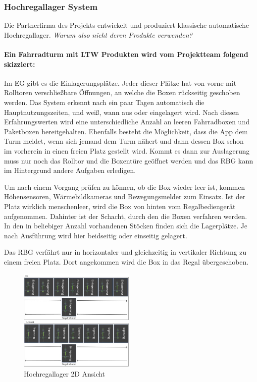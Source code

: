 \subsubsection{Hochregallager System}
Die Partnerfirma des Projekts entwickelt und produziert klassische automatische Hochregallager. \textit{Warum also nicht deren Produkte verwenden?}

\paragraph{Ein Fahrradturm mit LTW Produkten wird vom Projektteam folgend skizziert:}
Im EG gibt es die Einlagerungsplätze. Jeder dieser Plätze hat von vorne mit Rolltoren verschließbare Öffnungen, an welche die Boxen rückseitig geschoben werden. Das System erkennt nach ein paar Tagen automatisch die Hauptnutzungszeiten, und weiß, wann aus oder eingelagert wird. Nach diesen Erfahrungswerten wird eine unterschiedliche Anzahl an leeren Fahrradboxen und Paketboxen bereitgehalten. Ebenfalls besteht die Möglichkeit, dass die App dem Turm meldet, wenn sich jemand dem Turm nähert und dann dessen Box schon im vorherein in einen freien Platz gestellt wird. Kommt es dann zur Auslagerung muss nur noch das Rolltor und die Boxentüre geöffnet werden und das \ac{RBG} kann im Hintergrund andere Aufgaben erledigen.

\noindent Um nach einem Vorgang prüfen zu können, ob die Box wieder leer ist, kommen Höhensensoren, Wärmebildkameras und Bewegungsmelder zum Einsatz. Ist der Platz wirklich menschenleer, wird die Box von hinten vom Regalbediengerät aufgenommen. Dahinter ist der Schacht, durch den die Boxen verfahren werden. In den in beliebiger Anzahl vorhandenen Stöcken finden sich die Lagerplätze. Je nach Ausführung wird hier beidseitig oder einseitig gelagert.

\noindent Das \ac{RBG} verfährt nur in horizontaler und gleichzeitig in vertikaler Richtung zu einem freien Platz. Dort angekommen wird die Box in das Regal übergeschoben.

\begin{figure}[H]
    \centering
    \includegraphics[width=0.5\textwidth]{images/hochregallager2d.jpg}
    \caption{Hochregallager 2D Ansicht}
    \label{fig:hochregallager2d}
\end{figure}

